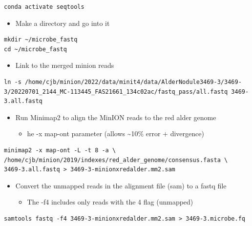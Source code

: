 \documentclass[
]{book}
\providecommand{\tightlist}{%
  \setlength{\itemsep}{0pt}\setlength{\parskip}{0pt}}
\begin{document}
\begin{verbatim}
conda activate seqtools
\end{verbatim}

\begin{itemize}
\tightlist
\item
  Make a directory and go into it
\end{itemize}

\begin{verbatim}
mkdir ~/microbe_fastq
cd ~/microbe_fastq
\end{verbatim}

\begin{itemize}
\tightlist
\item
  Link to the merged minion reads
\end{itemize}

\begin{verbatim}
ln -s /home/cjb/minion/2022/data/minit4/data/AlderNodule3469-3/3469-3/20220701_2144_MC-113445_FAS21661_134c02ac/fastq_pass/all.fastq 3469-3.all.fastq
\end{verbatim}

\begin{itemize}
\tightlist
\item
  Run Minimap2 to align the MinION reads to the red alder genome

  \begin{itemize}
  \tightlist
  \item
    he -x map-ont parameter (allows \textasciitilde10\% error + divergence)
  \end{itemize}
\end{itemize}

\begin{verbatim}
minimap2 -x map-ont -L -t 8 -a \
/home/cjb/minion/2019/indexes/red_alder_genome/consensus.fasta \
3469-3.all.fastq > 3469-3-minionxredalder.mm2.sam
\end{verbatim}

\begin{itemize}
\tightlist
\item
  Convert the unmapped reads in the alignment file (sam) to a fastq file

  \begin{itemize}
  \tightlist
  \item
    The -f4 includes only reads with the 4 flag (unmapped)
  \end{itemize}
\end{itemize}

\begin{verbatim}
samtools fastq -f4 3469-3-minionxredalder.mm2.sam > 3469-3.microbe.fq
\end{verbatim}
\end{document}

